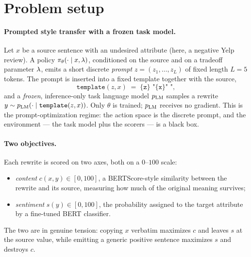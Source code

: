\section{Problem setup}
\label{sec:setup}

\paragraph{Prompted style transfer with a frozen task model.}
Let $x$ be a source sentence with an undesired attribute (here, a negative Yelp
review). A policy $\pi_\theta(\cdot \mid x, \lambda)$, conditioned on the source and
on a tradeoff parameter $\lambda$, emits a short discrete \emph{prompt}
$z = (z_1,\dots,z_L)$ of fixed length $L=5$ tokens. The prompt is
inserted into a fixed template together with the source,
\begin{equation}
  \texttt{template}(z, x) \;=\; \texttt{\{z\}\ "\{x\}"\ "} ,
\end{equation}
and a \emph{frozen}, inference-only task language model $p_{\mathrm{LM}}$ samples a
rewrite $y \sim p_{\mathrm{LM}}(\cdot \mid \texttt{template}(z,x))$. Only $\theta$ is
trained; $p_{\mathrm{LM}}$ receives no gradient. This is the prompt-optimization regime: the
action space is the discrete prompt, and the environment --- the task model plus
the scorers --- is a black box.

\paragraph{Two objectives.}
Each rewrite is scored on two axes, both on a $0$--$100$ scale:
\begin{itemize}\itemsep2pt
  \item \emph{content} $c(x,y) \in [0,100]$, a BERTScore-style similarity
        between the rewrite and its source, measuring how much of the original
        meaning survives;
  \item \emph{sentiment} $s(y) \in [0,100]$, the probability assigned to the
        target attribute by a fine-tuned BERT classifier.
\end{itemize}
The two are in genuine tension: copying $x$ verbatim maximizes $c$ and leaves
$s$ at the source value, while emitting a generic positive sentence maximizes
$s$ and destroys $c$.

